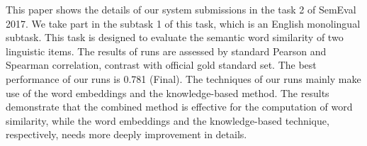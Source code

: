 This paper shows the details of our system submissions in the task 2 of SemEval 2017. We take part in the subtask 1 of this task, which is an English monolingual subtask. This task is designed to evaluate the semantic word similarity of two linguistic items. The results of runs are assessed by standard Pearson and Spearman correlation, contrast with official gold standard set. The best performance of our runs is 0.781 (Final). The techniques of our runs mainly make use of the word embeddings and the knowledge-based method. The results demonstrate that the combined method is effective for the computation of word similarity, while the word embeddings and the knowledge-based technique, respectively, needs more deeply improvement in details.
